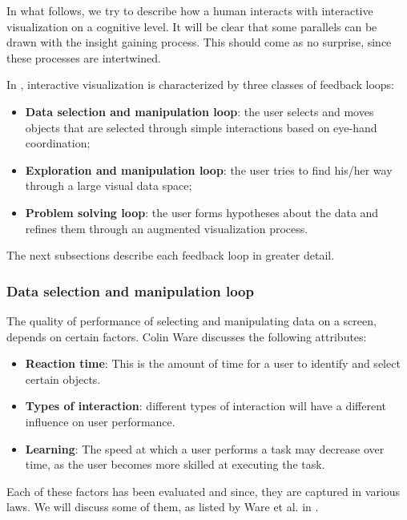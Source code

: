 In what follows, we try to describe how a human interacts with interactive visualization on a cognitive level. It will be clear that some parallels can be drawn with the insight gaining process. This should come as no surprise, since these processes are intertwined\cite{keim:2002, ware:2004, yi:2008}.

In \cite{ware:2004}, interactive visualization is characterized by three classes of feedback loops:

\begin{itemize}
	\item \textbf{Data selection and manipulation loop}: the user selects and moves objects that are selected through simple interactions based on eye-hand coordination;
	\item \textbf{Exploration and manipulation loop}: the user tries to find his/her way through a large visual data space;
	\item \textbf{Problem solving loop}: the user forms hypotheses about the data and refines them through an augmented visualization process.
\end{itemize}

The next subsections describe each feedback loop in greater detail.


\subsubsection{Data selection and manipulation loop}\label{subsubsection:data_manipulation_loop}

The quality of performance of selecting and manipulating data on a screen, depends on certain factors. Colin Ware discusses the following attributes:

\begin{itemize}
	\item \textbf{Reaction time}: This is the amount of time for a user to identify and select certain objects\cite{ware:2004}.
	\item \textbf{Types of interaction}: different types of interaction will have a different influence on user performance.
	\item \textbf{Learning}: The speed at which a user performs a task may decrease over time, as the user becomes more skilled at executing the task.
\end{itemize}

Each of these factors has been evaluated and since, they are captured in various laws. We will discuss some of them, as listed by Ware et al. in \cite{ware:2004}.

